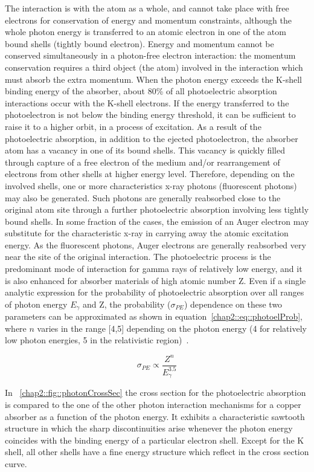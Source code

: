 The interaction is with the atom as a whole, and cannot take place with free electrons for conservation of energy and momentum constraints, although the whole photon energy is transferred to an atomic electron in one of the atom bound shells (tightly bound electron). Energy and momentum cannot be conserved simultaneously in a photon-free electron interaction: the momentum conservation requires a third object (the atom) involved in the interaction which must absorb the extra momentum. When the photon energy exceeds the K-shell binding energy of the absorber, about 80\% of all photoelectric absorption interactions occur with the K-shell electrons. If the energy transferred to the photoelectron is not below the binding energy threshold, it can be sufficient to raise it to a higher orbit, in a process of excitation. 
As a result of the photoelectric absorption, in addition to the ejected photoelectron, the absorber atom has a vacancy in one of its bound shells. This vacancy is quickly filled through capture of a free electron of the medium and/or rearrangement of electrons from other shells at higher energy level. Therefore, depending on the involved shells, one or more characteristics x-ray photons (fluorescent photons) may also be generated. Such photons are generally reabsorbed close to the original atom site through a further photoelectric absorption involving less tightly bound shells. In some fraction of the cases, the emission of an Auger electron may substitute for the characteristic x-ray in carrying away the atomic excitation energy. As the fluorescent photons, Auger electrons are generally reabsorbed very near the site of the original interaction.
The photoelectric process is the predominant mode of interaction for gamma rays of relatively low energy, and it is also enhanced for absorber materials of high atomic number Z. Even if a single analytic expression for the probability of photoelectric absorption over all ranges of photon energy $E_{\gamma}$ and Z, the probability ($\sigma_{PE}$) dependence on these two parameters can be approximated as shown in equation~\ref{chap2::eq::photoelProb}, where $n$ varies in the range [4,5] depending on the photon energy (4 for relatively low photon energies, 5 in the relativistic region)~\parencite{Knoll2000}.

\begin{equation}
\sigma_{PE} \varpropto \frac{Z^n}{E^{3.5}_{\gamma}} 
\label{chap2::eq::photoelProb}
\end{equation}  
 
In \figurename~\ref{chap2::fig::photonCrossSec} the cross section for the photoelectric absorption is compared to the one of the other photon interaction mechanisms for a copper absorber as a function of the photon energy. It exhibits a characteristic sawtooth structure in which the sharp discontinuities arise whenever the photon energy coincides with the binding energy of a particular electron shell. Except for the K shell, all other shells have a fine energy structure which reflect in the cross section curve.  

